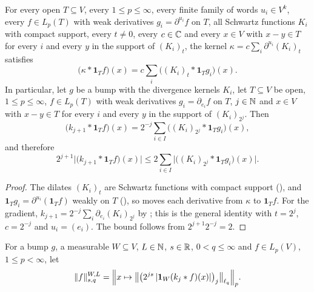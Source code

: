 \begin{lemma}
\label{lem:local-means-gradient-point}
\leanok
{}
For every open $T \subseteq V$, every $1 \leq p \leq \infty$, every finite family of words
$u_i \in V^k$, every $f \in L_p(T)$ with weak derivatives $g_i = \partial^{u_i} f$ on $T$, all
Schwartz functions $K_i$ with compact support, every $t \neq 0$, every $c \in \mathbb{C}$ and every
$x \in V$ with $x - y \in T$ for every $i$ and every $y$ in the support of $(K_i)_t$, the kernel
$\kappa = c \sum_i \partial^{u_i} (K_i)_t$ satisfies
\[
  \bigl(\kappa * \mathbf 1_T f\bigr)(x) = c \sum_i \bigl((K_i)_t * \mathbf 1_T g_i\bigr)(x) .
\]
In particular, let $g$ be a bump with the divergence kernels $K_i$, let $T \subseteq V$ be open,
$1 \leq p \leq \infty$, $f \in L_p(T)$ with weak derivatives $g_i = \partial_{e_i} f$ on $T$,
$j \in \mathbb{N}$ and $x \in V$ with $x - y \in T$ for every $i$ and every $y$ in the support of
$(K_i)_{2^j}$. Then
\[
  \bigl(k_{j+1} * \mathbf 1_T f\bigr)(x) = 2^{-j} \sum_{i \in I}
  \bigl((K_i)_{2^j} * \mathbf 1_T g_i\bigr)(x) ,
\]
and therefore
\[
  2^{j+1} \bigl|\bigl(k_{j+1} * \mathbf 1_T f\bigr)(x)\bigr| \leq 2 \sum_{i \in I}
  \bigl|\bigl((K_i)_{2^j} * \mathbf 1_T g_i\bigr)(x)\bigr| .
\]
\end{lemma}

\begin{proof}
\leanok
The dilates $(K_i)_t$ are Schwartz functions with compact support (), and
$\mathbf 1_T g_i = \partial^{u_i} (\mathbf 1_T f)$ weakly on $T$
(), so  moves each
derivative from $\kappa$ to $\mathbf 1_T f$. For the gradient,
$k_{j+1} = 2^{-j} \sum_i \partial_{e_i} (K_i)_{2^j}$ by ; this
is the general identity with $t = 2^j$, $c = 2^{-j}$ and $u_i = (e_i)$. The bound follows from
$2^{j+1} 2^{-j} = 2$.
\end{proof}

\begin{definition}
\label{def:tl-local-norm-on}
\leanok
{}
For a bump $g$, a measurable $W \subseteq V$, $L \in \mathbb{N}$, $s \in \mathbb{R}$, $0 < q \leq \infty$ and
$f \in L_p(V)$, $1 \leq p < \infty$, let
\[
  \|f\|^{W,L}_{s,q} = \Bigl\| x \mapsto \bigl\| \bigl(2^{js} \, |\mathbf 1_W (k_j * f)(x)|\bigr)_j
  \bigr\|_{\ell_q} \Bigr\|_p .
\]
\end{definition}

